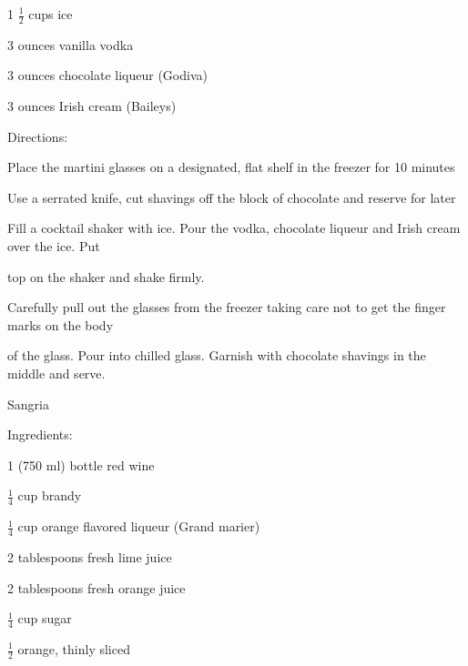 \documentclass[a4paper,portrait,12pt]{book}
\begin{document}
1 $\frac{1}{2}$ cups ice




3 ounces vanilla vodka




3 ounces chocolate liqueur (Godiva)




3 ounces Irish cream (Baileys)




Directions:




Place the martini glasses on a designated, flat shelf in the freezer for 10 minutes




Use a serrated knife, cut shavings off the block of chocolate and reserve for later




Fill a cocktail shaker with ice. Pour the vodka, chocolate liqueur and Irish cream over the ice. Put




top on the shaker and shake firmly.




Carefully pull out the glasses from the freezer taking care not to get the finger marks on the body




of the glass. Pour into chilled glass. Garnish with chocolate shavings in the middle and serve.







\newpage
Sangria




Ingredients:




1 (750 ml) bottle red wine




$\frac{1}{4}$ cup brandy




$\frac{1}{4}$ cup orange flavored liqueur (Grand marier)




2 tablespoons fresh lime juice




2 tablespoons fresh orange juice




$\frac{1}{4}$ cup sugar




$\frac{1}{2}$ orange, thinly sliced
\end{document}
